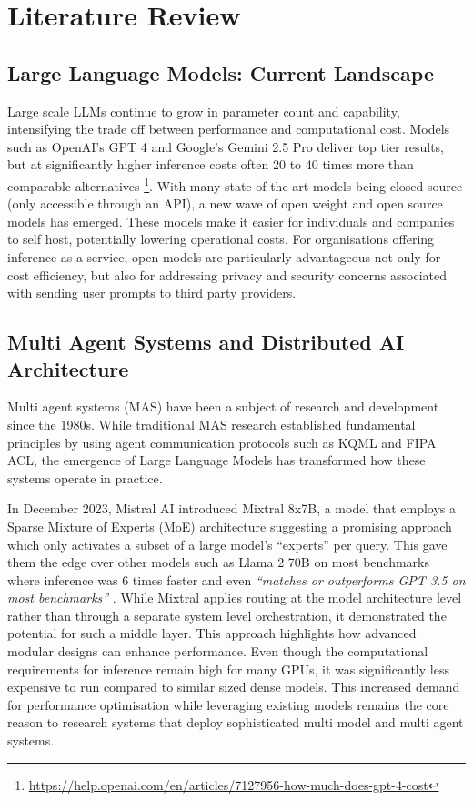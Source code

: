 \chapter{Literature Review}
\label{ch:lit_rev} %

\section{Large Language Models: Current Landscape}

Large scale LLMs continue to grow in parameter count and capability, intensifying the trade off between performance and computational cost. Models such as OpenAI's GPT 4 and Google's Gemini 2.5 Pro deliver top tier results, but at significantly higher inference costs often 20 to 40 times more than comparable alternatives \footnote{\url{https://help.openai.com/en/articles/7127956-how-much-does-gpt-4-cost}}. With many state of the art models being closed source (only accessible through an API), a new wave of open weight and open source models has emerged. These models make it easier for individuals and companies to self host, potentially lowering operational costs. For organisations offering inference as a service, open models are particularly advantageous not only for cost efficiency, but also for addressing privacy and security concerns associated with sending user prompts to third party providers.

\section{Multi Agent Systems and Distributed AI Architecture}

Multi agent systems (MAS) have been a subject of research and development since the 1980s. While traditional MAS research established fundamental principles by using agent communication protocols such as KQML and FIPA ACL, the emergence of Large Language Models has transformed how these systems operate in practice.

In December 2023, Mistral AI introduced Mixtral 8x7B, a model that employs a Sparse Mixture of Experts (MoE) architecture suggesting a promising approach which only activates a subset of a large model's “experts” per query. This gave them the edge over other models such as Llama 2 70B on most benchmarks where inference was 6 times faster and even \textit{“matches or outperforms GPT 3.5 on most benchmarks”} \cite{hu2024routerbenchbenchmarkmultillmrouting}. While Mixtral applies routing at the model architecture level rather than through a separate system level orchestration, it demonstrated the potential for such a middle layer. This approach highlights how advanced modular designs can enhance performance. Even though the computational requirements for inference remain high for many GPUs, it was significantly less expensive to run compared to similar sized dense models. This increased demand for performance optimisation while leveraging existing models remains the core reason to research systems that deploy sophisticated multi model and multi agent systems.

